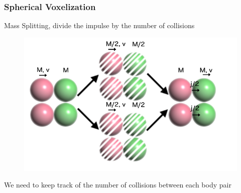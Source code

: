 \documentclass{beamer}
\begin{document}
	\begin{frame}
		\frametitle{Spherical Voxelization}
		Mass Splitting, divide the impulse by the number of collisions
		\begin{figure}
			\includegraphics[width=0.6\linewidth]{fig/ballsMassSplit.png}
		\end{figure}
		We need to keep track of the number of collisions between each body pair
	\end{frame}
\end{document}
